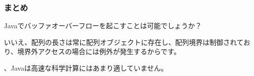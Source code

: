 \subsubsection{まとめ}

Javaでバッファオーバーフローを起こすことは可能でしょうか？

いいえ、配列の長さは常に配列オブジェクトに存在し、配列境界は制御されており、境界外アクセスの場合には例外が発生するからです。


、Javaは高速な科学計算にはあまり適していません。

%